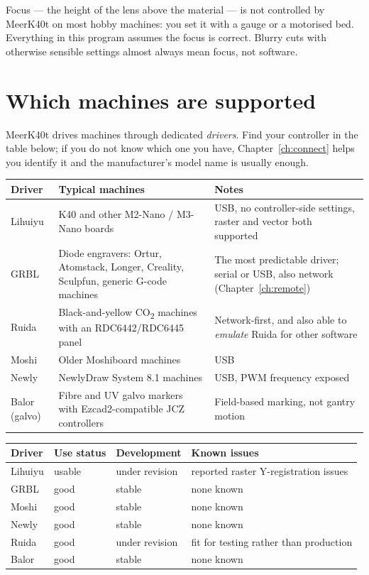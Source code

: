 \begin{notebox}[Focus]
Focus --- the height of the lens above the material --- is not controlled by
MeerK40t on most hobby machines: you set it with a gauge or a motorised bed.
Everything in this program assumes the focus is correct. Blurry cuts with
otherwise sensible settings almost always mean focus, not software.
\end{notebox}

\section{Which machines are supported}

MeerK40t drives machines through dedicated \emph{drivers}. Find your controller
in the table below; if you do not know which one you have, Chapter~\ref{ch:connect}
helps you identify it and the manufacturer's model name is usually enough.

\begin{center}\small
\begin{tabular}{@{}L{2.6cm}L{5.4cm}L{5.9cm}@{}}
\toprule
\textbf{Driver} & \textbf{Typical machines} & \textbf{Notes} \\
\midrule
Lihuiyu & K40 and other M2-Nano / M3-Nano boards & USB, no controller-side
settings, raster and vector both supported \\
GRBL & Diode engravers: Ortur, Atomstack, Longer, Creality, Sculpfun, generic
G-code machines & The most predictable driver; serial or USB, also network
(Chapter~\ref{ch:remote}) \\
Ruida & Black-and-yellow CO\textsubscript{2} machines with an RDC6442/RDC6445
panel & Network-first, and also able to \emph{emulate} Ruida for other software \\
Moshi & Older Moshiboard machines & USB \\
Newly & NewlyDraw System 8.1 machines & USB, PWM frequency exposed \\
Balor (galvo) & Fibre and UV galvo markers with Ezcad2-compatible JCZ controllers
& Field-based marking, not gantry motion \\
\bottomrule
\end{tabular}
\end{center}

\begin{center}\small
\begin{tabular}{@{}L{2.6cm}L{3.2cm}L{3.9cm}L{4.2cm}@{}}
\toprule
\textbf{Driver} & \textbf{Use status} & \textbf{Development} & \textbf{Known issues} \\
\midrule
Lihuiyu & usable & under revision & reported raster Y-registration issues \\
GRBL & good & stable & none known \\
Moshi & good & stable & none known \\
Newly & good & stable & none known \\
Ruida & good & under revision & fit for testing rather than production \\
Balor & good & stable & none known \\
\bottomrule
\end{tabular}
\end{center}

